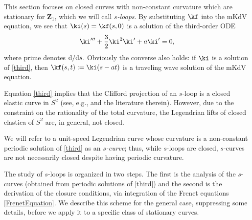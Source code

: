 \documentclass[pdftex]{sigma}
\newcommand\VZ{\mathbf Z}
\numberwithin{equation}{section}
\begin{document}
This section focuses on closed curves with non-constant curvature which are stationary for $\VZ_1$, which we will call {\it $s$-loops}. By substituting $\kf$ into the mKdV equation, we see that $\ki(s)=\kf(s,0)$ is a solution of the third-order ODE
\begin{equation}\label{third}
\ki'''+\frac{3}{2}\ki^2\ki'+a \ki' = 0,\end{equation}
where prime denotes ${\rm d}/{\rm d}s$. Obviously the converse also holds: if $\ki$ is a solution of \eqref{third}, then $\kf(s,t):=\ki(s-at)$ is a traveling wave solution of the mKdV equation.

\begin{Remark} Equation \eqref{third} implies that the Clifford projection of an $s$-loop is a closed elastic curve in $S^2$ (see, e.g., \cite{He} and the literature therein). However, due to the constraint on the rationality of the total curvature, the Legendrian lifts of closed elastica of $S^2$ are, in general, not closed.
\end{Remark}

We will refer to a unit-speed Legendrian curve whose curvature is a non-constant periodic solution of \eqref{third} as an {\it $s$-curve}; thus, while $s$-loops are closed, $s$-curves are not necessarily closed despite having periodic curvature.

The study of $s$-loops is organized in two steps. The first is the analysis of the $s$-curves (obtained from periodic solutions of \eqref{third}) and the second is the derivation of the closure conditions, via integration of the Frenet equations \eqref{FrenetEquation}. We describe this scheme for the general case, suppressing some details, before we apply it to a specific class of stationary curves.
\end{document}

